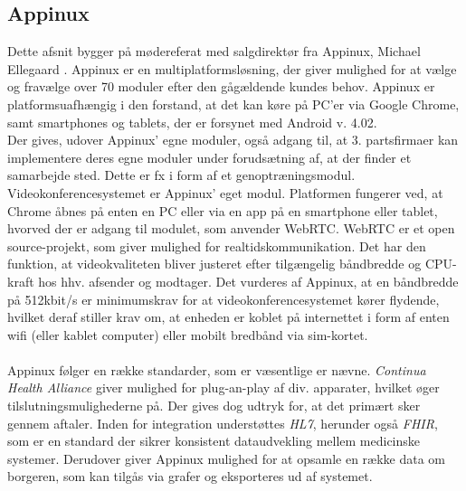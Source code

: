 \subsection{Appinux}
Dette afsnit bygger på mødereferat med salgdirektør fra Appinux, Michael Ellegaard \parencite{moedeappinux}.
Appinux er en multiplatformsløsning, der giver mulighed for at vælge og fravælge over 70 moduler efter den gågældende kundes behov. Appinux er platformsuafhængig i den forstand, at det kan køre på PC'er via Google Chrome, samt  smartphones og tablets, der er forsynet med Android v. 4.02.\\Der gives, udover Appinux' egne moduler, også adgang til, at 3. partsfirmaer kan implementere deres egne moduler under forudsætning af, at der finder et samarbejde sted. Dette er fx i form af et genoptræningsmodul.\\Videokonferencesystemet er Appinux' eget modul. Platformen fungerer ved, at Chrome åbnes på enten en PC eller via en app på en smartphone eller tablet, hvorved der er adgang til modulet, som anvender WebRTC. WebRTC er et open source-projekt, som giver mulighed for realtidskommunikation. Det har den funktion, at videokvaliteten bliver justeret efter tilgængelig båndbredde og CPU-kraft hos hhv. afsender og modtager. Det vurderes af Appinux, at en båndbredde på 512kbit/s er minimumskrav for at videokonferencesystemet kører flydende, hvilket deraf stiller krav om, at enheden er koblet på internettet i form af enten wifi (eller kablet computer) eller mobilt bredbånd via sim-kortet.
\\ \\
Appinux følger en række standarder, som er væsentlige   er nævne. \textit{Continua Health Alliance} giver mulighed for plug-an-play af div. apparater, hvilket øger tilslutningsmulighederne på. Der gives dog udtryk for, at det primært sker gennem aftaler. Inden for integration understøttes \textit{HL7}, herunder også \textit{FHIR}, som er en standard der sikrer konsistent dataudvekling mellem medicinske systemer. Derudover giver Appinux mulighed for at opsamle en række data om borgeren, som kan tilgås via grafer og eksporteres ud af systemet.

